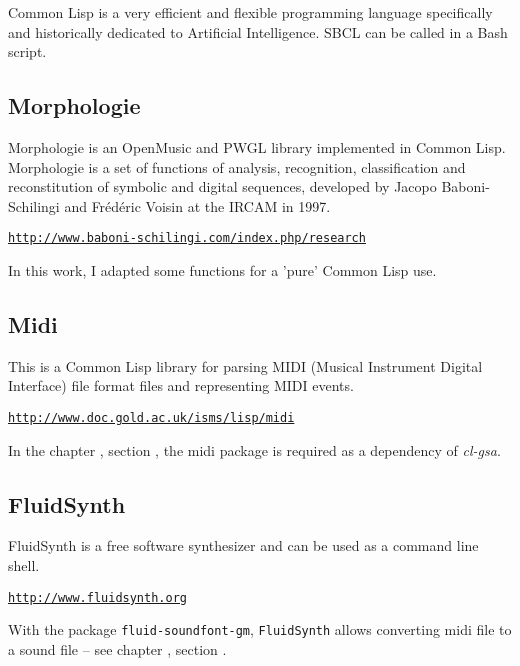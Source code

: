 \bigskip

Common Lisp is a very efficient and flexible programming language specifically and historically dedicated to Artificial Intelligence.
SBCL can be called in a Bash script.

\subsection*{Morphologie}

Morphologie is an OpenMusic and PWGL library implemented in Common Lisp. Morphologie is a set of functions of analysis, recognition, classification and reconstitution of symbolic and digital sequences, developed by Jacopo Baboni-Schilingi and Fr\'ed\'eric Voisin at the IRCAM in 1997.

\href{http://www.baboni-schilingi.com/index.php/research}{\texttt{\small http://www.baboni-schilingi.com/index.php/research}}


\bigskip

In this work, I adapted some functions for a 'pure' Common Lisp use.

\subsection*{Midi}

This is a Common Lisp library for parsing MIDI (Musical Instrument Digital Interface) file format files and representing MIDI events.

\href{http://www.doc.gold.ac.uk/isms/lisp/midi}{\texttt{\small http://www.doc.gold.ac.uk/isms/lisp/midi}}

\bigskip

In the chapter \textsl{}, section \textsl{}, the midi package is required as a dependency of \textsl{cl-gsa}.

\subsection*{FluidSynth}

FluidSynth is a free software synthesizer and can be used as a command line shell.

\href{http://www.fluidsynth.org}{\texttt{\small http://www.fluidsynth.org}}

\bigskip

With the package \texttt{fluid-soundfont-gm}, \texttt{FluidSynth} allows converting midi file to a sound file -- see chapter \textsl{}, section \textsl{}.

